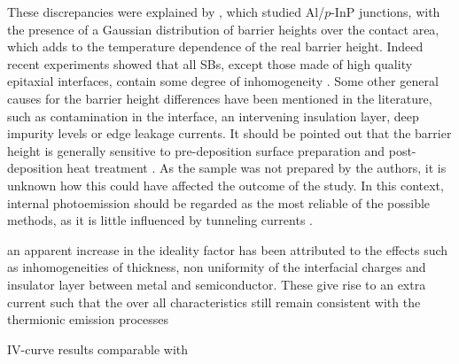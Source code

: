 These discrepancies were explained by \cite{song_difference_1986}, which studied Al/$p$-InP junctions, with the presence of a Gaussian distribution of barrier heights over the contact area, which adds to the temperature dependence of the real barrier height.
Indeed recent experiments showed that all SBs, except those made of high quality epitaxial interfaces, contain some degree of inhomogeneity \cite{tung_recent_2001}.
Some other general causes for the barrier height differences have been mentioned in the literature, such as contamination in the interface, an intervening insulation layer, deep impurity levels or edge leakage currents.
It should be pointed out that the barrier height is generally sensitive to pre-deposition surface preparation and post-deposition heat treatment \cite{sze_physics_2007}.
As the sample was not prepared by the authors, it is unknown how this could have affected the outcome of the study.
In this context, internal photoemission should be regarded as the most reliable of the possible methods, as it is little influenced by tunneling currents \cite{schroder_semiconductor_2006}.

an apparent increase in
the ideality factor has been attributed to the effects
such as inhomogeneities of thickness, non uniformity of
the interfacial charges and insulator layer between
metal and semiconductor. These give rise to an extra
current such that the over all characteristics still
remain consistent with the thermionic emission
processes \cite{dhimmar_analysis_2016}

IV-curve results comparable with \cite{dhimmar_analysis_2016}